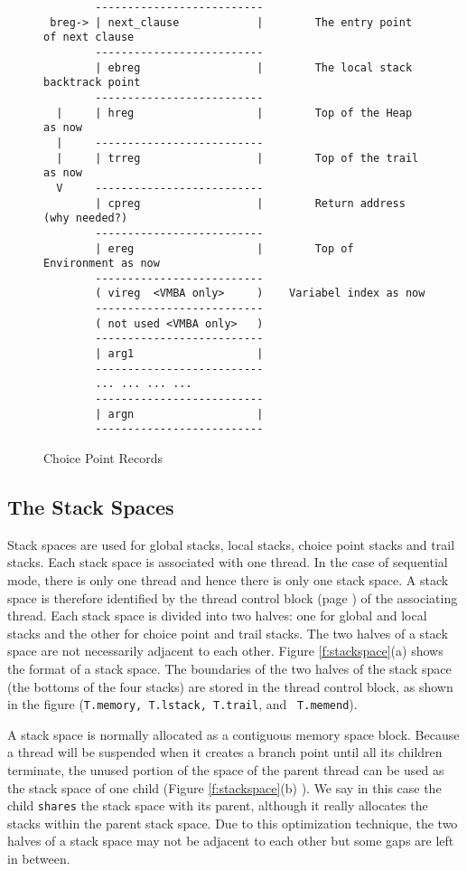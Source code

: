 \documentclass[11pt]{article}
\begin{document}
\begin{figure}
\begin{verbatim}
        --------------------------
 breg-> | next_clause            |        The entry point of next clause
        --------------------------
        | ebreg                  |        The local stack backtrack point
        --------------------------
  |     | hreg                   |        Top of the Heap as now
  |     --------------------------
  |     | trreg                  |        Top of the trail as now
  V     --------------------------
        | cpreg                  |        Return address (why needed?)
        --------------------------
        | ereg                   |        Top of Environment as now
        --------------------------
        ( vireg  <VMBA only>	 )	  Variabel index as now
        --------------------------
        ( not used <VMBA only>	 )
        --------------------------
        | arg1                   |
        --------------------------
        ... ... ... ...
        --------------------------
        | argn                   |
        --------------------------
\end{verbatim}
\caption{Choice Point Records}
\label{f:cp}
\end{figure}



\subsection{The Stack Spaces}

Stack spaces are used for global stacks, local stacks, choice point
stacks and trail stacks.  Each stack space is associated with one
thread. In the case of sequential mode, there is only one thread and
hence there is only one stack space.  A stack space is therefore
identified by the thread control block (page \pageref{pg:tcb}) of the
associating thread.  Each stack space is divided into two halves: one
for global and local stacks and the other for choice point and trail
stacks.  The two halves of a stack space are not necessarily adjacent
to each other.  Figure \ref{f:stackspace}(a) shows the format of a
stack space.  The boundaries of the two halves of the stack space (the
bottoms of the four stacks) are stored in the thread control block, as
shown in the figure ({\tt T.memory, T.lstack, T.trail}, and {\tt
T.memend}).

A stack space is normally allocated as a contiguous memory space
block.  Because a thread will be suspended when it creates a branch
point until all its children terminate, the unused portion of the
space of the parent thread can be used as the stack space of one child
(Figure \ref{f:stackspace}(b) ). We say in this case the child
{\tt shares} the stack space with its parent, although it really
allocates the stacks within the parent stack space.  Due to this
optimization technique, the two halves of a stack space may not be
adjacent to each other but some gaps are left in between.
\end{document}
